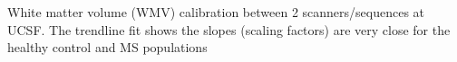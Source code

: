 \label{fig:hcms_WMV} White matter volume (WMV) calibration between 2 scanners/sequences at UCSF. The trendline fit shows the slopes (scaling factors) are very close for the healthy control and MS populations
